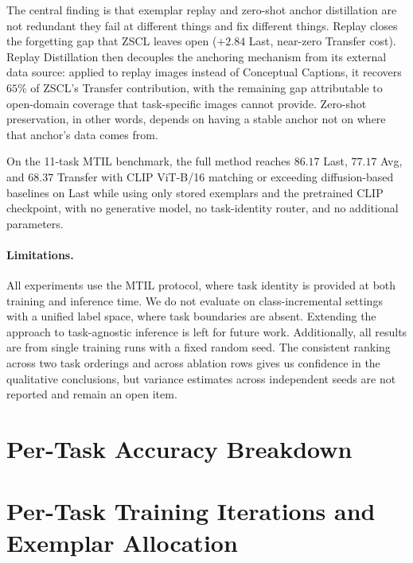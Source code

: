 \documentclass{article}
\begin{document}
  The central finding is that exemplar replay and zero-shot anchor distillation are
  not redundant they fail at different things and fix different things. Replay
  closes the forgetting gap that ZSCL leaves open ($+2.84$ Last, near-zero Transfer
  cost). Replay Distillation then decouples the anchoring mechanism from its external
  data source: applied to replay images instead of Conceptual Captions, it recovers
  $65\%$ of ZSCL's Transfer contribution, with the remaining gap attributable to
  open-domain coverage that task-specific images cannot provide. Zero-shot
  preservation, in other words, depends on having a stable anchor not on where
  that anchor's data comes from.

  On the 11-task MTIL benchmark, the full method reaches $86.17$ Last, $77.17$ Avg,
  and $68.37$ Transfer with CLIP ViT-B/16 matching or exceeding diffusion-based
  baselines on Last while using only stored exemplars and the pretrained CLIP
  checkpoint, with no generative model, no task-identity router, and no additional
  parameters.

  \paragraph{Limitations.} All experiments use the MTIL protocol, where task
  identity is provided at both training and inference time. We do not evaluate on
  class-incremental settings with a unified label space, where task boundaries are
  absent. Extending the approach to task-agnostic inference is left for future work.
  Additionally, all results are from single training runs with a fixed random
  seed. The consistent ranking across two task orderings and across ablation rows
  gives us confidence in the qualitative conclusions, but variance estimates across
  independent seeds are not reported and remain an open item.

  
  

   \appendix

  \section{Per-Task Accuracy Breakdown}
  \label{app:pertask}

  \section{Per-Task Training Iterations and Exemplar Allocation}
  \label{app:iterations}
\end{document}
